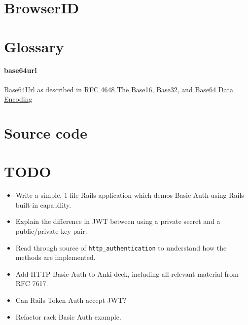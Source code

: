 \documentclass{article}
\begin{document}
\section{BrowserID}

\appendix

\section{Glossary}

\paragraph{base64url} \href{https://en.wikipedia.org/wiki/Base64#URL_applications}{%
  Base64Url} as described in \href{https://tools.ietf.org/html/rfc4648}{%
    RFC 4648 The Base16, Base32, and Base64 Data Encoding}

\section{Source code}

\section{TODO}

\begin{itemize}
  \item Write a simple, 1 file Rails application which demos Basic Auth
    using Rails built-in capability.
  \item Explain the difference in JWT between using a private secret and a
    public/private key pair.
  \item Read through source of \texttt{http\_authentication} to understand how
    the methods are implemented.
  \item Add HTTP Basic Auth to Anki deck, including all relevant material from
    RFC 7617.
  \item Can Rails Token Auth accept JWT?
  \item Refactor rack Basic Auth example.
\end{itemize}
\end{document}
